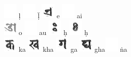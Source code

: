 \documentclass[a4paper,12pt]{article}
\begin{document}
{\includegraphics[height=8.0mm]{white.jpg} ḷ \includegraphics[height=8.0mm]{white.jpg} ḹ \includegraphics[height=8.0mm]{e.jpg} e \includegraphics[height=8.0mm]{white.jpg} ai \\
\includegraphics[height=8.0mm]{o.jpg} o \includegraphics[height=8.0mm]{white.jpg} au \includegraphics[height=8.0mm]{anu1.jpg} ḥ \includegraphics[height=8.0mm]{anu2.jpg} ḥ \\
\includegraphics[height=8.0mm]{ka.jpg} ka \includegraphics[height=8.0mm]{kha.jpg} kha \includegraphics[height=8.0mm]{ga.jpg} ga \includegraphics[height=8.0mm]{gha.jpg} gha\includegraphics[height=8.0mm]{white.jpg} ṅa\\
}
\end{document}
